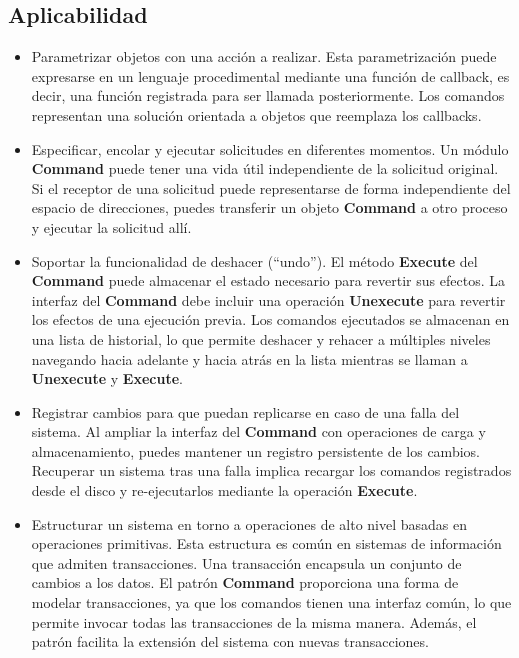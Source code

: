 \subsection*{Aplicabilidad}

\begin{itemize}
\item Parametrizar objetos con una acción a realizar. Esta parametrización puede expresarse en un lenguaje procedimental mediante una función de \gls{callback}, es decir, una función registrada para ser llamada posteriormente. Los comandos representan una solución orientada a objetos que reemplaza los \glspl{callback}.

\item Especificar, encolar y ejecutar solicitudes en diferentes momentos. Un módulo \textbf{Command} puede tener una vida útil independiente de la solicitud original. Si el receptor de una solicitud puede representarse de forma independiente del espacio de direcciones, puedes transferir un objeto \textbf{Command} a otro proceso y ejecutar la solicitud allí.

\item Soportar la funcionalidad de deshacer (``undo''). El método \textbf{Execute} del \textbf{Command} puede almacenar el estado necesario para revertir sus efectos. La interfaz del \textbf{Command} debe incluir una operación \textbf{Unexecute} para revertir los efectos de una ejecución previa. Los comandos ejecutados se almacenan en una lista de historial, lo que permite deshacer y rehacer a múltiples niveles navegando hacia adelante y hacia atrás en la lista mientras se llaman a \textbf{Unexecute} y \textbf{Execute}.

\item Registrar cambios para que puedan replicarse en caso de una falla del sistema. Al ampliar la interfaz del \textbf{Command} con operaciones de carga y almacenamiento, puedes mantener un registro persistente de los cambios. Recuperar un sistema tras una falla implica recargar los comandos registrados desde el disco y re-ejecutarlos mediante la operación \textbf{Execute}.

\item Estructurar un sistema en torno a operaciones de alto nivel basadas en operaciones primitivas. Esta estructura es común en sistemas de información que admiten transacciones. Una transacción encapsula un conjunto de cambios a los datos. El patrón \textbf{Command} proporciona una forma de modelar transacciones, ya que los comandos tienen una interfaz común, lo que permite invocar todas las transacciones de la misma manera. Además, el patrón facilita la extensión del sistema con nuevas transacciones.
\end{itemize}


